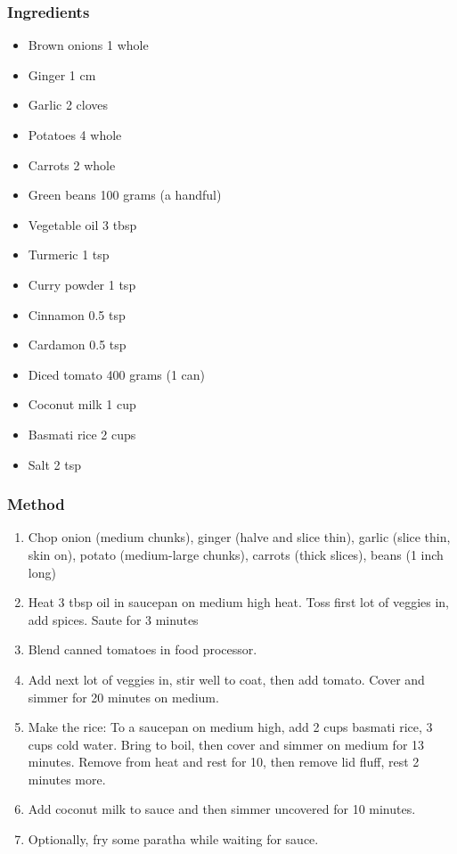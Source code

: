 \documentclass[]{article}
\begin{document}
\subsubsection*{\Large Ingredients}
\begin{multicols}{2}
\begin{itemize}
 \item Brown onions \hfill 1 whole
 \item Ginger \hfill 1 cm
 \item Garlic \hfill 2 cloves
 \item Potatoes \hfill 4 whole
 \item Carrots \hfill 2 whole
 \item Green beans \hfill 100 grams (a handful)
 \item Vegetable oil \hfill 3 tbsp
 \item Turmeric \hfill 1 tsp
 \item Curry powder \hfill 1 tsp
 \item Cinnamon \hfill 0.5 tsp
 \item Cardamon \hfill 0.5 tsp
 \item Diced tomato \hfill 400 grams (1 can)
 \item Coconut milk \hfill 1 cup
 \item Basmati rice \hfill 2 cups
 \item Salt \hfill 2 tsp
\end{itemize}
\end{multicols}
\subsubsection*{\Large Method}
\begin{enumerate}[font=\huge\color{accent}]
	\item Chop onion (medium chunks), ginger (halve and slice thin), garlic (slice thin, skin on), potato (medium-large chunks), carrots (thick slices), beans (1 inch long)
	\item Heat 3 tbsp oil in saucepan on medium high heat. Toss first lot of veggies in, add spices. Saute for 3 minutes
	\item Blend canned tomatoes in food processor.
	\item Add next lot of veggies in, stir well to coat, then add tomato. Cover and simmer for 20 minutes on medium.
	\item Make the rice: To a saucepan on medium high, add 2 cups basmati rice, 3 cups cold water. Bring to boil, then cover and simmer on medium for 13 minutes. Remove from heat and rest for 10, then remove lid fluff, rest 2 minutes more.
	\item Add coconut milk to sauce and then simmer uncovered for 10 minutes.
	\item Optionally, fry some paratha while waiting for sauce.
\end{enumerate}
\newpage
{}
\end{document}
